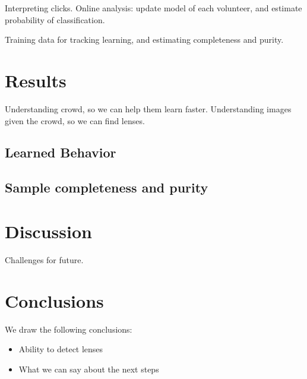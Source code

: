 \documentclass[useAMS,usenatbib,a4paper]{mn2e}
\begin{document}
Interpreting clicks. Online analysis: update model of each volunteer,
and estimate probability of classification.

Training data for tracking learning, and estimating completeness and
purity.


\section{Results}
\label{sec:results}

Understanding crowd, so we can help them learn faster. Understanding
images given the crowd, so we can find lenses.


\subsection{Learned Behavior}
\label{sec:results:learning}


\subsection{Sample completeness and purity}
\label{sec:results:learning}




\section{Discussion}
\label{sec:discuss}

Challenges for future.


\section{Conclusions}
\label{sec:conclude}

We draw the following conclusions:

\begin{itemize} 

\item Ability to detect lenses

\item What we can say about the next steps

\end{itemize}
\end{document}
